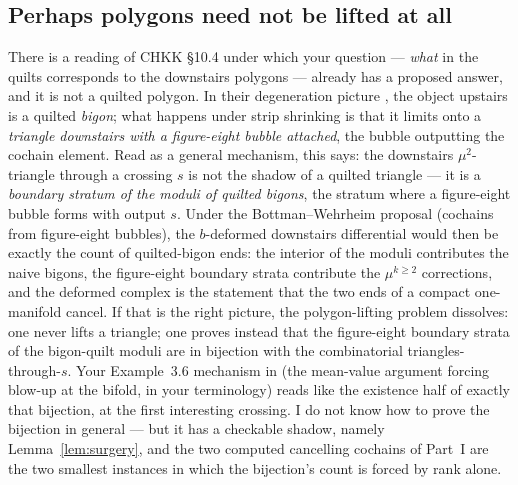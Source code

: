 \documentclass[11pt,reqno]{amsart}
\theoremstyle{plain}
\theoremstyle{definition}
\newcommand{\bc}{b}
\begin{document}
\subsection{Perhaps polygons need not be lifted at all}\label{ss:broken}
There is a reading of CHKK \S10.4 under which your question --- \emph{what} in the quilts
corresponds to the downstairs polygons --- already has a proposed answer, and it is not a
quilted polygon. In their degeneration picture \cite[Figures 22--23]{CHKK}, the object upstairs is
a quilted \emph{bigon}; what happens under strip shrinking is that it limits onto a
\emph{triangle downstairs with a figure-eight bubble attached}, the bubble outputting the
cochain element. Read as a general mechanism, this says: the downstairs $\mu^2$-triangle
through a crossing $s$ is not the shadow of a quilted triangle --- it is a \emph{boundary
stratum of the moduli of quilted bigons}, the stratum where a figure-eight bubble forms with
output $s$. Under the Bottman--Wehrheim proposal (cochains from figure-eight bubbles), the
$\bc$-deformed downstairs differential would then be exactly the count of quilted-bigon ends:
the interior of the moduli contributes the naive bigons, the figure-eight boundary strata
contribute the $\mu^{k\ge2}$ corrections, and the deformed complex is the statement that the
two ends of a compact one-manifold cancel. If that is the right picture, the polygon-lifting
problem dissolves: one never lifts a triangle; one proves instead that the figure-eight
boundary strata of the bigon-quilt moduli are in bijection with the combinatorial
triangles-through-$s$. Your Example~3.6 mechanism in \cite{Z2} (the mean-value argument
forcing blow-up at the bifold, in your terminology) reads like the existence half of exactly that bijection, at
the first interesting crossing. I do not know how to prove the bijection in general --- but
it has a checkable shadow, namely Lemma~\ref{lem:surgery}, and the two computed cancelling
cochains of Part~I are the two smallest instances in which the bijection's count is forced by
rank alone.
\end{document}

